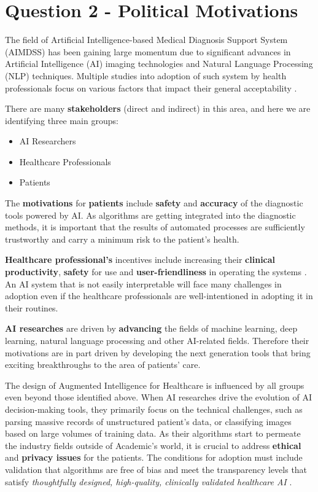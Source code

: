 \documentclass[12pt,letterpaper]{article}
\begin{document}
\section*{Question 2 - Political Motivations}

The field of Artificial Intelligence-based Medical Diagnosis Support System (AIMDSS) has been gaining large momentum due to significant advances in Artificial Intelligence (AI) imaging technologies and Natural Language Processing (NLP) techniques. Multiple studies into adoption of such system by health professionals focus on various factors that impact their general acceptability \cite{fan2018investigating}.

There are many \textbf{stakeholders} (direct and indirect) in this area, and here we are identifying three main groups:

\begin{itemize}
    \item AI Researchers
    \item Healthcare Professionals
    \item Patients 
\end{itemize}

The \textbf{motivations} for \textbf{patients} include \textbf{safety} and \textbf{accuracy} of the diagnostic tools powered by AI. As algorithms are getting integrated into the diagnostic methods, it is important that the results of automated processes are sufficiently trustworthy and carry a minimum risk to the patient's health. 

\textbf{Healthcare professional's} incentives include increasing their \textbf{clinical productivity}, \textbf{safety} for use and \textbf{user-friendliness} in operating the systems \cite{ishak2002artificial}. An AI system that is not easily interpretable will face many challenges in adoption even if the healthcare professionals are well-intentioned in adopting it in their routines. 

\textbf{AI researches} are driven by \textbf{advancing} the fields of machine learning, deep learning, natural language processing and other AI-related fields. Therefore their motivations are in part driven by developing the next generation tools that bring exciting breakthroughs to the area of patients' care.

The design of Augmented Intelligence for Healthcare is influenced by all groups even beyond those identified above. When AI researches drive the evolution of AI decision-making tools, they primarily focus on the technical challenges, such as parsing massive records of unstructured patient's data, or classifying images based on large volumes of training data. As their algorithms start to permeate the industry fields outside of Academic's world, it is crucial to address \textbf{ethical} and \textbf{privacy issues} for the patients. The conditions for adoption must include validation that algorithms are free of bias and meet the transparency levels that satisfy \textit{thoughtfully designed, high-quality, clinically validated healthcare AI} \cite{blog:healthitanalytics}.
\end{document}
